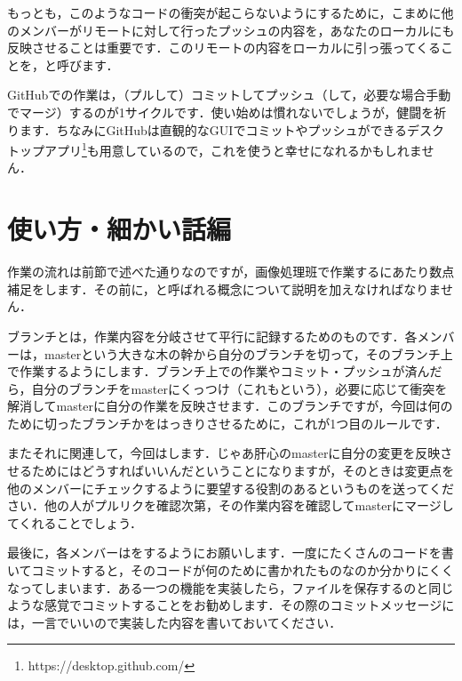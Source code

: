 \documentclass{jsarticle}
\begin{document}
もっとも，このようなコードの衝突が起こらないようにするために，こまめに他のメンバーがリモートに対して行ったプッシュの内容を，あなたのローカルにも反映させることは重要です．このリモートの内容をローカルに引っ張ってくることを，と呼びます．

GitHubでの作業は，（プルして）コミットしてプッシュ（して，必要な場合手動でマージ）するのが1サイクルです．使い始めは慣れないでしょうが，健闘を祈ります．ちなみにGitHubは直観的なGUIでコミットやプッシュができるデスクトップアプリ\footnote{https://desktop.github.com/}も用意しているので，これを使うと幸せになれるかもしれません．
\section{使い方・細かい話編}
作業の流れは前節で述べた通りなのですが，画像処理班で作業するにあたり数点補足をします．その前に，と呼ばれる概念について説明を加えなければなりません．

ブランチとは，作業内容を分岐させて平行に記録するためのものです．各メンバーは，masterという大きな木の幹から自分のブランチを切って，そのブランチ上で作業するようにします．ブランチ上での作業やコミット・プッシュが済んだら，自分のブランチをmasterにくっつけ（これもという），必要に応じて衝突を解消してmasterに自分の作業を反映させます．このブランチですが，今回は何のために切ったブランチかをはっきりさせるために，これが1つ目のルールです．

またそれに関連して，今回はします．じゃあ肝心のmasterに自分の変更を反映させるためにはどうすればいいんだということになりますが，そのときは変更点を他のメンバーにチェックするように要望する役割のあるというものを送ってください．他の人がプルリクを確認次第，その作業内容を確認してmasterにマージしてくれることでしょう．

最後に，各メンバーはをするようにお願いします．一度にたくさんのコードを書いてコミットすると，そのコードが何のために書かれたものなのか分かりにくくなってしまいます．ある一つの機能を実装したら，ファイルを保存するのと同じような感覚でコミットすることをお勧めします．その際のコミットメッセージには，一言でいいので実装した内容を書いておいてください．
\end{document}
